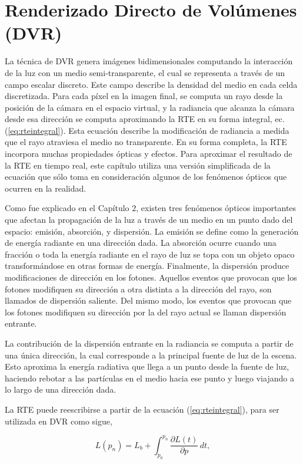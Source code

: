 \section{Renderizado Directo de Volúmenes (DVR)}

La técnica de DVR genera imágenes bidimensionales computando la interacción de la luz con un medio semi-transparente, el cual se representa a través de un campo escalar discreto.
Este campo describe la densidad del medio en cada celda discretizada.
Para cada píxel en la imagen final, se computa un rayo desde la posición de la cámara en el espacio virtual, y la radiancia que alcanza la cámara desde esa dirección se computa aproximando la RTE en su forma integral, ec. (\ref{eq:rteintegral}).
Esta ecuación describe la modificación de radiancia a medida que el rayo atraviesa el medio no transparente.
En su forma completa, la RTE incorpora muchas propiedades ópticas y efectos.
Para aproximar el resultado de la RTE en tiempo real, este capítulo utiliza una versión simplificada de la ecuación que sólo toma en consideración algunos de los fenómenos ópticos que ocurren en la realidad.

Como fue explicado en el Capítulo $2$, existen tres fenómenos ópticos importantes que afectan la propagación de la luz a través de un medio en un punto dado del espacio: emisión, absorción, y dispersión.
La emisión se define como la generación de energía radiante en una dirección dada.
La absorción ocurre cuando una fracción o toda la energía radiante en el rayo de luz se topa con un objeto opaco transformándose en otras formas de energía.
Finalmente, la dispersión produce modificaciones de dirección en los fotones.
Aquellos eventos que provocan que los fotones modifiquen su dirección a otra distinta a la dirección del rayo, son llamados de dispersión saliente. Del mismo modo, los eventos que provocan que los fotones modifiquen su dirección por la del rayo actual se llaman dispersión entrante.

%
La contribución de la dispersión entrante en la radiancia se computa a partir de una única dirección, la cual corresponde a la principal fuente de luz de la escena.
Esto aproxima la energía radiativa que llega a un punto desde la fuente de luz, haciendo rebotar a las partículas en el medio hacia ese punto y luego viajando a lo largo de una dirección dada. 

La RTE puede reescribirse a partir de la ecuación (\ref{eq:rteintegral}), para ser utilizada en DVR como sigue,

\begin{equation} \label{eq:general_radiance}  
  L(p_n) = L_b + \int_{p_0}^{p_n} \frac{\partial L(t)}{\partial p} \, dt,
\end{equation}

